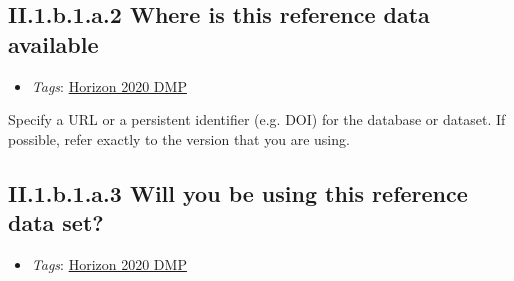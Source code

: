 \documentclass[a4paper,12pt]{report}
\begin{document}
\subsection*{\protect\textcolor{colorSecId}{II.1.b.1.a.2} Where is this reference data available}

\label{82fd0cce-2b41-423f-92ad-636d0872045c.efc80cc8-8318-4f8c-acb7-dc1c60e491c1.2663b978-5125-4224-9930-0a50dbe895c9.fcc51962-08df-4f4c-85ad-6bb932107010.0b1610c4-5030-43a3-8a6c-c69693351a79.7801fe70-a2ac-432b-9470-e326646c249f}


\begin{itemize}
  \item \textit{Tags}: \ul{Horizon 2020 DMP}
  \end{itemize}


\noindent
\begin{markdown}
Specify a URL or a persistent identifier (e.g. DOI) for the database or dataset. If possible, refer exactly to the version that you are using.
\end{markdown}




\subsection*{\protect\textcolor{colorSecId}{II.1.b.1.a.3} Will you be using this reference data set?}

\label{82fd0cce-2b41-423f-92ad-636d0872045c.efc80cc8-8318-4f8c-acb7-dc1c60e491c1.2663b978-5125-4224-9930-0a50dbe895c9.fcc51962-08df-4f4c-85ad-6bb932107010.0b1610c4-5030-43a3-8a6c-c69693351a79.58401091-2d48-4231-983a-c972d11d9f6e}


\begin{itemize}
  \item \textit{Tags}: \ul{Horizon 2020 DMP}
  \end{itemize}
\end{document}
